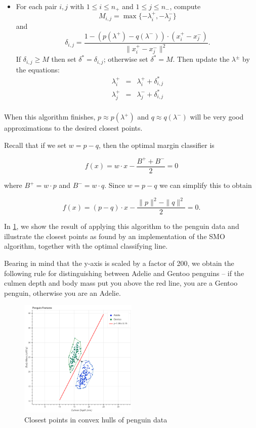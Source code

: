 \documentclass[
  oneside]{scrbook}
\providecommand{\tightlist}{%
  \setlength{\itemsep}{0pt}\setlength{\parskip}{0pt}}
\begin{document}
\begin{itemize}
\tightlist
\item
  For each pair \(i,j\) with \(1\le i\le n_{+}\) and
  \(1\le j\le n_{-}\), compute \[
  M_{i,j} = \max\{-\lambda_{i}^{+},-\lambda_{j}^{-}\}
  \] and \[
  \delta_{i,j} = \frac{1-(p(\lambda^{+})-q(\lambda^{-}))\cdot(x_{i}^{+}-x_{j}^{-})}{\|x^+_{i}-x^{-}_{j}\|^2}.
  \] If \(\delta_{i,j}\ge M\) then set \(\delta^{*}=\delta_{i,j}\);
  otherwise set \(\delta^{*}=M\). Then update the \(\lambda^{\pm}\) by
  the equations: \[
  \begin{aligned}
  \lambda^{+}_{i}&=&\lambda^{+}_{i}+\delta_{i,j}^{*} \\
  \lambda^{+}_{j}&=&\lambda^{-}_{j}+\delta_{i,j}^{*} \\
  \end{aligned}
  \]
\end{itemize}

When this algorithm finishes, \(p\approx p(\lambda^{+})\) and
\(q\approx q(\lambda^{-})\) will be very good approximations to the
desired closest points.

Recall that if we set \(w=p-q\), then the optimal margin classifier is

\[
f(x)=w\cdot x - \frac{B^{+}+B^{-}}{2}=0
\]

where \(B^{+}=w\cdot p\) and \(B^{-}=w\cdot q\). Since \(w=p-q\) we can
simplify this to obtain

\[
f(x)=(p-q)\cdot x -\frac{\|p\|^2-\|q\|^2}{2}=0.
\]

In \cref{fig:penguinsolution}, we show the result of applying this
algorithm to the penguin data and illustrate the closest points as found
by an implementation of the SMO algorithm, together with the optimal
classifying line.

Bearing in mind that the y-axis is scaled by a factor of 200, we obtain
the following rule for distinguishing between Adelie and Gentoo penguins
-- if the culmen depth and body mass put you above the red line, you are
a Gentoo penguin, otherwise you are an Adelie.

\begin{figure}
\hypertarget{fig:penguinsolution}{%
\centering
\includegraphics[width=0.5\textwidth,height=\textheight]{img/solution.png}
\caption{Closest points in convex hulls of penguin
data}\label{fig:penguinsolution}
}
\end{figure}
\end{document}
